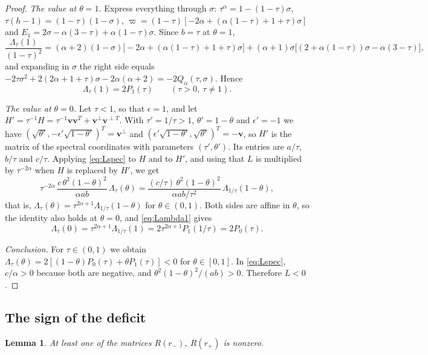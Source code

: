 \documentclass[11pt]{amsart}
\newtheorem{lemma}[theorem]{Lemma}
\theoremstyle{definition}
\theoremstyle{remark}
\numberwithin{equation}{section}
\newcommand{\bv}{\mathbf{v}}
\begin{document}
\begin{proof}
\emph{The value at $\theta=1$.} Express everything through $\sigma$: $\tau^\alpha=1-(1-\tau)\sigma$, $\tau(h-1)=(1-\tau)(1-\sigma)$, $\varpi=(1-\tau)[-2\alpha+(\alpha(1-\tau)+1+\tau)\sigma]$ and $E_1=2\sigma-\alpha(3-\tau)+\alpha(1-\tau)\sigma$. Since $b=\tau$ at $\theta=1$,
\[
\frac{\Lambda_\tau(1)}{(1-\tau)^2}=(\alpha+2)(1-\sigma)\bigl[-2\alpha+(\alpha(1-\tau)+1+\tau)\sigma\bigr]+(\alpha+1)\sigma\bigl[(2+\alpha(1-\tau))\sigma-\alpha(3-\tau)\bigr],
\]
and expanding in $\sigma$ the right side equals $-2\tau\sigma^2+2(2\alpha+1+\tau)\sigma-2\alpha(\alpha+2)=-2Q_\alpha(\tau,\sigma)$. Hence
\begin{equation}\label{eq:Lambda1}
\Lambda_\tau(1)=2P_1(\tau)\qquad(\tau>0,\ \tau\ne1).
\end{equation}

\emph{The value at $\theta=0$.} Let $\tau<1$, so that $\epsilon=1$, and let $H'=\tau^{-1}H=\tau^{-1}\bv\bv^T+\bv^\perp\bv^{\perp T}$. With $\tau'=1/\tau>1$, $\theta'=1-\theta$ and $\epsilon'=-1$ we have $(\sqrt{\theta'},-\epsilon'\sqrt{1-\theta'})^T=\bv^\perp$ and $(\epsilon'\sqrt{1-\theta'},\sqrt{\theta'})^T=-\bv$, so $H'$ is the matrix of the spectral coordinates with parameters $(\tau',\theta')$. Its entries are $a/\tau$, $b/\tau$ and $c/\tau$. Applying \eqref{eq:Lspec} to $H$ and to $H'$, and using that $L$ is multiplied by $\tau^{-2\alpha}$ when $H$ is replaced by $H'$, we get
\[
\tau^{-2\alpha}\,\frac{c\,\theta^2(1-\theta)^2}{\alpha ab}\,\Lambda_\tau(\theta)=\frac{(c/\tau)\,\theta^2(1-\theta)^2}{\alpha ab/\tau^2}\,\Lambda_{1/\tau}(1-\theta),
\]
that is, $\Lambda_\tau(\theta)=\tau^{2\alpha+1}\Lambda_{1/\tau}(1-\theta)$ for $\theta\in(0,1)$. Both sides are affine in $\theta$, so the identity also holds at $\theta=0$, and \eqref{eq:Lambda1} gives
\[
\Lambda_\tau(0)=\tau^{2\alpha+1}\Lambda_{1/\tau}(1)=2\tau^{2\alpha+1}P_1(1/\tau)=2P_0(\tau).
\]

\emph{Conclusion.} For $\tau\in(0,1)$ we obtain $\Lambda_\tau(\theta)=2[(1-\theta)P_0(\tau)+\theta P_1(\tau)]<0$ for $\theta\in[0,1]$. In \eqref{eq:Lspec}, $c/\alpha>0$ because both are negative, and $\theta^2(1-\theta)^2/(ab)>0$. Therefore $L<0$.
\end{proof}

\subsection{The sign of the deficit}

\begin{lemma}\label{lem:nonzero}
At least one of the matrices $R(r_-)$, $R(r_+)$ is nonzero.
\end{lemma}
\end{document}
